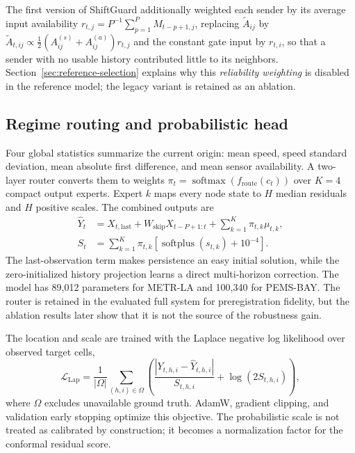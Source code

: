 \documentclass[preprint,12pt]{elsarticle}
\begin{document}
The first version of ShiftGuard additionally weighted each sender by its
average input availability $r_{t,j}=P^{-1}\sum_{p=1}^{P}M_{t-p+1,j}$, replacing
$\widetilde A_{ij}$ by
$\widetilde A_{t,ij}\propto\tfrac12(A^{(s)}_{ij}+A^{(a)}_{ij})r_{t,j}$ and the
constant gate input by $r_{t,i}$, so that a sender with no usable history
contributed little to its neighbors. Section~\ref{sec:reference-selection}
explains why this \emph{reliability weighting} is disabled in the reference
model; the legacy variant is retained as an ablation.

\subsection{Regime routing and probabilistic head}
Four global statistics summarize the current origin: mean speed, speed standard
deviation, mean absolute first difference, and mean sensor availability. A
two-layer router converts them to weights
$\pi_t=\operatorname{softmax}(f_{\mathrm{route}}(c_t))$ over $K=4$ compact
output experts. Expert $k$ maps every node state to $H$ median residuals and $H$
positive scales. The combined outputs are
\begin{align}
 \hat Y_t &= X_{t,\mathrm{last}}+
 W_{\mathrm{skip}}X_{t-P+1:t}+\sum_{k=1}^{K}\pi_{t,k}\mu_{t,k},\\
 S_t &= \sum_{k=1}^{K}\pi_{t,k}
 \left[\operatorname{softplus}(s_{t,k})+10^{-4}\right].
\end{align}
The last-observation term makes persistence an easy initial solution, while the
zero-initialized history projection learns a direct multi-horizon correction.
The model has 89,012 parameters for METR-LA and 100,340 for PEMS-BAY. The router
is retained in the evaluated full system for preregistration fidelity, but the
ablation results later show that it is not the source of the robustness gain.

The location and scale are trained with the Laplace negative log likelihood
over observed target cells,
\begin{equation}
 \mathcal{L}_{\mathrm{Lap}}=
 \frac{1}{|\Omega|}\sum_{(h,i)\in\Omega}
 \left(\frac{|Y_{t,h,i}-\hat Y_{t,h,i}|}{S_{t,h,i}}+
 \log(2S_{t,h,i})\right),
\end{equation}
where $\Omega$ excludes unavailable ground truth. AdamW, gradient clipping, and
validation early stopping optimize this objective. The probabilistic scale is
not treated as calibrated by construction; it becomes a normalization factor
for the conformal residual score.
\end{document}
